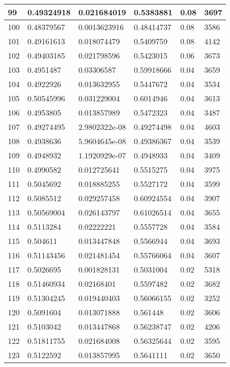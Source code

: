 \begin{longtable}{|l|l|l|l|l|l|}
99 & 0.49324918 & 0.021684019 & 0.5383881 & 0.08 & 3697 \\ \hline 
100 & 0.48379567 & 0.0013623916 & 0.48414737 & 0.08 & 3586 \\ \hline 
101 & 0.49161613 & 0.018074479 & 0.5409759 & 0.08 & 4142 \\ \hline 
102 & 0.49403185 & 0.021798596 & 0.5423015 & 0.06 & 3673 \\ \hline 
103 & 0.4951487 & 0.03306587 & 0.59918666 & 0.04 & 3659 \\ \hline 
104 & 0.4922926 & 0.013632955 & 0.5447672 & 0.04 & 3534 \\ \hline 
105 & 0.50545996 & 0.031229004 & 0.6014946 & 0.04 & 3613 \\ \hline 
106 & 0.4953805 & 0.013857989 & 0.5472323 & 0.04 & 3487 \\ \hline 
107 & 0.49274495 & 2.9802322e-08 & 0.49274498 & 0.04 & 4603 \\ \hline 
108 & 0.4938636 & 5.9604645e-08 & 0.49386367 & 0.04 & 3539 \\ \hline 
109 & 0.4948932 & 1.1920929e-07 & 0.4948933 & 0.04 & 3409 \\ \hline 
110 & 0.4990582 & 0.012725641 & 0.5515275 & 0.04 & 3975 \\ \hline 
111 & 0.5045692 & 0.018885255 & 0.5527172 & 0.04 & 3599 \\ \hline 
112 & 0.5085512 & 0.029257458 & 0.60924554 & 0.04 & 3907 \\ \hline 
113 & 0.50569004 & 0.026143797 & 0.61026514 & 0.04 & 3655 \\ \hline 
114 & 0.5113284 & 0.02222221 & 0.5557728 & 0.04 & 3584 \\ \hline 
115 & 0.504611 & 0.013447848 & 0.5566944 & 0.04 & 3693 \\ \hline 
116 & 0.51143456 & 0.021481454 & 0.55766064 & 0.04 & 3607 \\ \hline 
117 & 0.5026695 & 0.001828131 & 0.5031004 & 0.02 & 5318 \\ \hline 
118 & 0.51460934 & 0.02168401 & 0.5597482 & 0.02 & 3682 \\ \hline 
119 & 0.51304245 & 0.019440403 & 0.56066155 & 0.02 & 3252 \\ \hline 
120 & 0.5091604 & 0.013071888 & 0.561448 & 0.02 & 3606 \\ \hline 
121 & 0.5103042 & 0.013447868 & 0.56238747 & 0.02 & 4206 \\ \hline 
122 & 0.51811755 & 0.021684008 & 0.56325644 & 0.02 & 3595 \\ \hline 
123 & 0.5122592 & 0.013857995 & 0.5641111 & 0.02 & 3650 \\ \hline 

\end{longtable}
